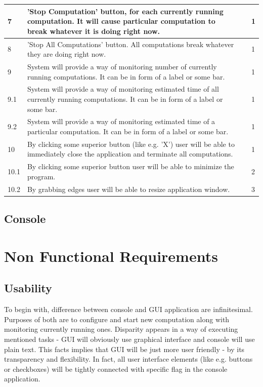 \documentclass{article}
\begin{document}
\begin{center}
\begin{longtable}{| l | p{4cm} | p{3.5cm} | l |}
		7 & 
		'Stop Computation' button, for each currently running computation. It will cause 				particular computation to break whatever it is doing right now. & 
		 &
		1
		\\ \hline	
		
		8 & 
		'Stop All Computations' button. All computations break whatever they are doing right 			now. & 
		 &
		1
		\\ \hline		
		
		9 & 
		System will provide a way of monitoring number of currently running computations. It 			can be in form of a label or some bar. & 
		 &
		1
		\\ \hline	

		9.1 & 
		System will provide a way of monitoring estimated time of all currently running 				computations. It can be in form of a label or some bar. & 
		 &
		1
		\\ \hline

		9.2 & 
		System will provide a way of monitoring estimated time of a particular computation. It 			can be in form of a label or some bar. & 
		 &
		1
		\\ \hline

		10 & 
		By clicking some superior button (like e.g. 'X') user will be able to immediately 				close the application and terminate all computations.  & 
		 &
		1
		\\ \hline
	
		10.1 & 
		By clicking some superior button user will be able to minimize the program. & 
		 &
		2
		\\ \hline	

		10.2 & 
		By grabbing edges user will be able to resize application window. & 
		 &
		3
		\\ \hline
		
	\end{longtable}
\end{center}	

\subsection{Console}


\newpage

\section{Non Functional Requirements}
\subsection{Usability}
To begin with, difference between console and GUI application are infinitesimal. Purposes of both are to configure and start new computation along with monitoring currently running ones.
Disparity appears in a way of executing mentioned tasks - GUI will obviously use graphical interface and console will use plain text. This facts implies that GUI will be just more user friendly - by its transparency and flexibility. In fact, all user interface elements (like e.g. buttons or checkboxes) will be tightly connected with specific flag in the console application.
\end{document}
